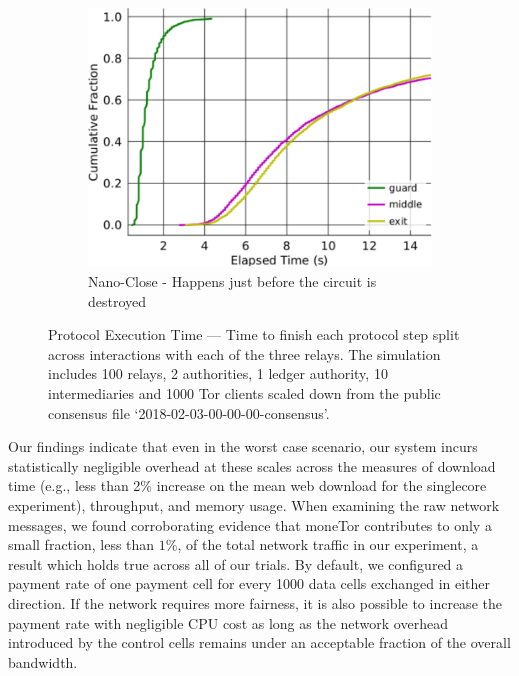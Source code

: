 \begin{figure}[t]
\begin{subfigure}[t]{0.32\textwidth}
    \label{fig:ttfp}
  \end{subfigure}
  \begin{subfigure}[t]{0.32\textwidth} \centering
    \includegraphics[trim={0 0cm 0 0cm}, clip, width=1.0\textwidth]{images/payment_close.pdf}
    \caption{Nano-Close - Happens just before the circuit is destroyed}
    \label{fig:payments_close}
  \end{subfigure}
  \caption{Protocol Execution Time --- Time to finish each protocol step split across interactions with each of the three relays.
    The simulation includes 100 relays, 2 authorities, 1 ledger authority, 10 intermediaries and 1000 Tor clients scaled down from the public consensus file `2018-02-03-00-00-00-consensus'.}
  \label{fig:latencymeasurements}
\end{figure}

Our findings indicate that even in the worst case scenario, our system incurs statistically negligible overhead at these scales across the measures of download time (e.g., less than 2\% increase on the mean web download for the singlecore experiment), throughput, and memory usage.
When examining the raw network messages, we found corroborating evidence that moneTor contributes to only a small fraction, less than $1\%$, of the total network traffic in our experiment, a result which holds true across all of our trials.
By default, we configured a payment rate of one payment cell for every 1000 data cells exchanged in either direction.
If the network requires more fairness, it is also possible to increase the payment rate with negligible CPU cost as long as the network overhead introduced by the control cells remains under an acceptable fraction of the overall bandwidth.

